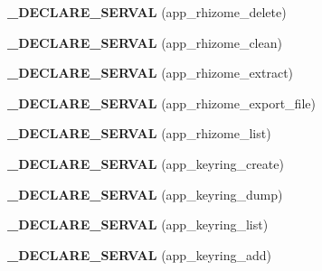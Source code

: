 \begin{DoxyCompactItemize}
\item 
\hypertarget{serval-client_8c_a85a606635134a478583d734266a91c47}{{\bfseries \-\_\-\-D\-E\-C\-L\-A\-R\-E\-\_\-\-S\-E\-R\-V\-A\-L} (app\-\_\-rhizome\-\_\-delete)}\label{serval-client_8c_a85a606635134a478583d734266a91c47}

\item 
\hypertarget{serval-client_8c_a037e8f3471691367ee34c55a1beb3c05}{{\bfseries \-\_\-\-D\-E\-C\-L\-A\-R\-E\-\_\-\-S\-E\-R\-V\-A\-L} (app\-\_\-rhizome\-\_\-clean)}\label{serval-client_8c_a037e8f3471691367ee34c55a1beb3c05}

\item 
\hypertarget{serval-client_8c_aecd3364bf7d9d5955e4ee3abf38d1dad}{{\bfseries \-\_\-\-D\-E\-C\-L\-A\-R\-E\-\_\-\-S\-E\-R\-V\-A\-L} (app\-\_\-rhizome\-\_\-extract)}\label{serval-client_8c_aecd3364bf7d9d5955e4ee3abf38d1dad}

\item 
\hypertarget{serval-client_8c_ae93fea8244ef72d3638c172646cfd535}{{\bfseries \-\_\-\-D\-E\-C\-L\-A\-R\-E\-\_\-\-S\-E\-R\-V\-A\-L} (app\-\_\-rhizome\-\_\-export\-\_\-file)}\label{serval-client_8c_ae93fea8244ef72d3638c172646cfd535}

\item 
\hypertarget{serval-client_8c_ad223a69e159212af44a2a2f5ed5ef784}{{\bfseries \-\_\-\-D\-E\-C\-L\-A\-R\-E\-\_\-\-S\-E\-R\-V\-A\-L} (app\-\_\-rhizome\-\_\-list)}\label{serval-client_8c_ad223a69e159212af44a2a2f5ed5ef784}

\item 
\hypertarget{serval-client_8c_ae6446b814403b74a80e829d8692c59e7}{{\bfseries \-\_\-\-D\-E\-C\-L\-A\-R\-E\-\_\-\-S\-E\-R\-V\-A\-L} (app\-\_\-keyring\-\_\-create)}\label{serval-client_8c_ae6446b814403b74a80e829d8692c59e7}

\item 
\hypertarget{serval-client_8c_a519ceefd067ede53988a2bd1419d9a1b}{{\bfseries \-\_\-\-D\-E\-C\-L\-A\-R\-E\-\_\-\-S\-E\-R\-V\-A\-L} (app\-\_\-keyring\-\_\-dump)}\label{serval-client_8c_a519ceefd067ede53988a2bd1419d9a1b}

\item 
\hypertarget{serval-client_8c_a8394b1a564778fbc05fc185ae0bc31ce}{{\bfseries \-\_\-\-D\-E\-C\-L\-A\-R\-E\-\_\-\-S\-E\-R\-V\-A\-L} (app\-\_\-keyring\-\_\-list)}\label{serval-client_8c_a8394b1a564778fbc05fc185ae0bc31ce}

\item 
\hypertarget{serval-client_8c_a0fab286f8c4a70663d8fd78136cbb650}{{\bfseries \-\_\-\-D\-E\-C\-L\-A\-R\-E\-\_\-\-S\-E\-R\-V\-A\-L} (app\-\_\-keyring\-\_\-add)}\label{serval-client_8c_a0fab286f8c4a70663d8fd78136cbb650}


\end{DoxyCompactItemize}
